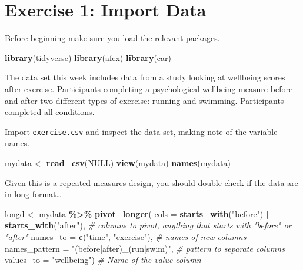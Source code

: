 \documentclass[
]{book}
\newenvironment{Shaded}{\begin{snugshade}}{\end{snugshade}}
\newcommand{\AttributeTok}[1]{\textcolor[rgb]{0.13,0.29,0.53}{#1}}
\newcommand{\CommentTok}[1]{\textcolor[rgb]{0.56,0.35,0.01}{\textit{#1}}}
\newcommand{\ConstantTok}[1]{\textcolor[rgb]{0.56,0.35,0.01}{#1}}
\newcommand{\FunctionTok}[1]{\textcolor[rgb]{0.13,0.29,0.53}{\textbf{#1}}}
\newcommand{\NormalTok}[1]{#1}
\newcommand{\OtherTok}[1]{\textcolor[rgb]{0.56,0.35,0.01}{#1}}
\newcommand{\SpecialCharTok}[1]{\textcolor[rgb]{0.81,0.36,0.00}{\textbf{#1}}}
\newcommand{\StringTok}[1]{\textcolor[rgb]{0.31,0.60,0.02}{#1}}
\let\oldsection\section
\renewcommand{\section}{\needspace{5\baselineskip}\oldsection}
\begin{document}
\section{Exercise 1: Import Data}\label{exercise-1-import-data-1}

Before beginning make sure you load the relevant packages.

\begin{Shaded}
\begin{Highlighting}[]
\FunctionTok{library}\NormalTok{(tidyverse)}
\FunctionTok{library}\NormalTok{(afex)}
\FunctionTok{library}\NormalTok{(car)}
\end{Highlighting}
\end{Shaded}

The data set this week includes data from a study looking at wellbeing scores after exercise. Participants completing a psychological wellbeing measure before and after two different types of exercise: running and swimming. Participants completed all conditions.

Import \texttt{exercise.csv} and inspect the data set, making note of the variable names.

\begin{Shaded}
\begin{Highlighting}[]
\NormalTok{mydata }\OtherTok{\textless{}{-}} \FunctionTok{read\_csv}\NormalTok{(}\ConstantTok{NULL}\NormalTok{)}
\FunctionTok{view}\NormalTok{(mydata)}
\FunctionTok{names}\NormalTok{(mydata)}
\end{Highlighting}
\end{Shaded}

Given this is a repeated measures design, you should double check if the data are in long format\ldots{}

\begin{Shaded}
\begin{Highlighting}[]
\NormalTok{longd }\OtherTok{\textless{}{-}}\NormalTok{ mydata }\SpecialCharTok{\%\textgreater{}\%}
  \FunctionTok{pivot\_longer}\NormalTok{(}
    \AttributeTok{cols =} \FunctionTok{starts\_with}\NormalTok{(}\StringTok{"before"}\NormalTok{) }\SpecialCharTok{|} \FunctionTok{starts\_with}\NormalTok{(}\StringTok{"after"}\NormalTok{), }\CommentTok{\# columns to pivot, anything that starts with "before" or "after"}
    \AttributeTok{names\_to =} \FunctionTok{c}\NormalTok{(}\StringTok{"time"}\NormalTok{, }\StringTok{"exercise"}\NormalTok{), }\CommentTok{\# names of new columns}
    \AttributeTok{names\_pattern =} \StringTok{"(before|after)\_(run|swim)"}\NormalTok{, }\CommentTok{\# pattern to separate columns}
    \AttributeTok{values\_to =} \StringTok{"wellbeing"}\NormalTok{) }\CommentTok{\# Name of the value column}
\end{Highlighting}
\end{Shaded}
\end{document}
